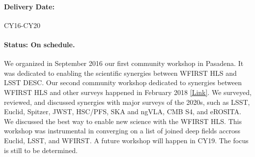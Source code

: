 \paragraph*{Delivery Date:} CY16-CY20

\paragraph*{Status: On schedule.} We organized in September 2016 our first community workshop in Pasadena. It was dedicated to enabling the scientific synergies between WFIRST HLS and LSST DESC. Our second community workshop dedicated to synergies between WFIRST HLS and other surveys happened in February 2018 \href{http://www.wfirst-hls-cosmology.org/workshops/}{[Link]}. We surveyed, reviewed, and discussed synergies with major surveys of the 2020s, such as LSST, Euclid, Spitzer, JWST, HSC/PFS, SKA and ngVLA, CMB S4, and eROSITA. We discussed the best way to enable new science with the WFIRST HLS. This workshop was instrumental in converging on a list of joined deep fields accross Euclid, LSST, and WFIRST. A future workshop will happen in CY19. The focus is still to be determined.

